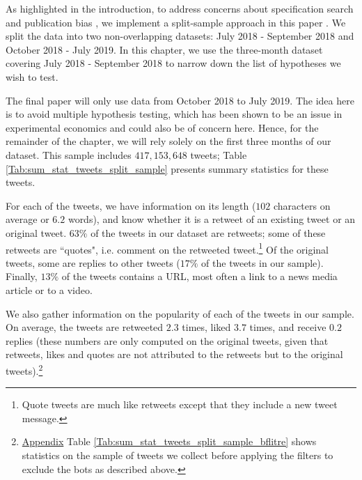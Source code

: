 
As highlighted in the introduction, to address concerns about specification search and publication bias \citep{Leamer1978,Leamer1983,Glaeser2006_incentives}, we implement a split-sample approach in this paper \citep{FafchampsLabonne2016,FafchampsLabonne2017,AndersonMagruder2017}. We split the data into two non-overlapping datasets: July 2018 - September 2018 and October 2018 - July 2019. In this chapter, we use the three-month dataset covering July 2018 - September 2018 to narrow down the list of hypotheses we wish to test.

The final paper will only use data from October 2018 to July 2019. The idea here is to avoid multiple hypothesis testing, which has been shown to be an issue in experimental economics \citep{ListShaikhXu2019} and could also be of concern here. Hence, for the remainder of the chapter, we will rely solely on the first three months of our dataset. This sample includes $417,153,648$ tweets; Table \ref{Tab:sum_stat_tweets_split_sample} presents summary statistics for these tweets. 

For each of the tweets, we have information on its length ($102$ characters on average or $6.2$ words), and know whether it is a retweet of an existing tweet or an original tweet. $63\%$ of the tweets in our dataset are retweets; some of these retweets are ``quotes", i.e. comment on the retweeted tweet.\footnote{Quote tweets are much like retweets except that they include a new tweet message.} Of the original tweets, some are replies to other tweets ($17\%$ of the tweets in our sample). Finally, $13\%$ of the tweets contains a URL, most often a link to a news media article or to a video.

We also gather information on the popularity of each of the tweets in our sample. On average, the tweets are retweeted $2.3$ times, liked $3.7$ times, and receive $0.2$ replies (these numbers are only computed on the original tweets, given that retweets, likes and quotes are not attributed to the retweets but to the original tweets).\footnote{\hyperlink{ref:Appendix}{Appendix} Table \ref{Tab:sum_stat_tweets_split_sample_bflitre} shows statistics on the sample of tweets we collect before applying the filters to exclude the bots as described above.} 


